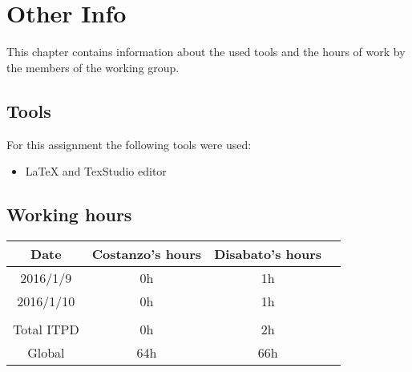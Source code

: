 \documentclass[\mainpath/main]{subfiles}
\begin{document}
\chapter{Other Info}
\label{OtherInfo}

\setmyfancystyle

This chapter contains information about the used tools and the hours of work by the members of the working group.

\section{Tools}
For this assignment the following tools were used:
\begin{itemize}
	\item \LaTeX{} and TexStudio editor
\end{itemize}

\section{Working hours}
\begin{table}[h!]
	\centering
\begin{tabular}{cccc}
\hline
Date       & Costanzo's hours & Disabato's hours  & \\ \hline
2016/1/9 & 0h 			  & 1h 			  & \\ \hline
2016/1/10 & 0h 			  & 1h 			  & \\ \hline

\\
Total ITPD  & 0h 		      & 2h 			 	  & \\ \hline
Global 	   & 64h 		 	  & 66h 			  & \\ \hline

\end{tabular}
\end{table}
\end{document}
